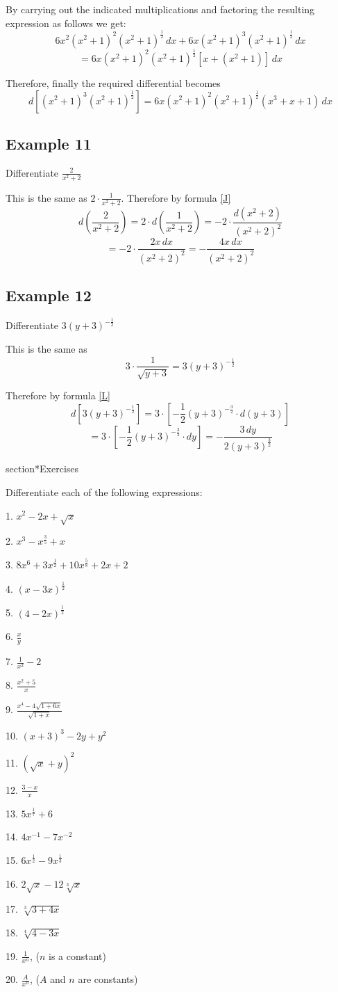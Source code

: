 By carrying out the indicated multiplications and factoring the resulting expression as follows we get:
\[6x^2(x^2+1)^2(x^2+1)^{\frac{1}{2}}\,dx + 6x(x^2+1)^3(x^2+1)^{\frac{1}{2}}\,dx\]
\[= 6x(x^2+1)^2(x^2+1)^{\frac{1}{2}}[x + (x^2+1)]\,dx\]

Therefore, finally the required differential becomes
\[d[(x^2+1)^3(x^2+1)^{\frac{1}{2}}] = 6x(x^2+1)^2(x^2+1)^{\frac{1}{2}}(x^3+x+1)\,dx\]

\subsection*{Example 11}
Differentiate $\frac{2}{x^2 + 2}$

This is the same as $2\cdot\frac{1}{x^2 + 2}$. Therefore by formula \eqref{J}
\[d(\frac{2}{x^2 + 2}) = 2\cdot d(\frac{1}{x^2 + 2}) = -2\cdot\frac{d(x^2 + 2)}{(x^2 + 2)^2}\]
\[= -2\cdot\frac{2x\,dx}{(x^2 + 2)^2} = -\frac{4x\,dx}{(x^2 + 2)^2}\]

\subsection*{Example 12}
Differentiate $3(y+3)^{-\frac{1}{2}}$

This is the same as
\[3\cdot\frac{1}{\sqrt{y+3}} = 3(y+3)^{-\frac{1}{2}}\]

Therefore by formula \eqref{L}
\[d[3(y+3)^{-\frac{1}{2}}] = 3\cdot[-\frac{1}{2}(y+3)^{-\frac{3}{2}}\cdot d(y+3)]\]
\[= 3\cdot[-\frac{1}{2}(y+3)^{-\frac{3}{2}}\cdot dy] = -\frac{3\,dy}{2(y+3)^{\frac{3}{2}}}\]

\clearpage  %

section*{Exercises}

Differentiate each of the following expressions:

1. $x^2 - 2x + \sqrt{x}$

2. $x^3 - x^{\frac{3}{5}} + x$

3. $8x^6 + 3x^{\frac{1}{2}} + 10x^{\frac{5}{8}} + 2x + 2$

4. $(x - 3x)^{\frac{1}{2}}$

5. $(4 - 2x)^{\frac{1}{2}}$

6. $\frac{x}{y}$

7. $\frac{1}{x^2} - 2$

8. $\frac{x^2 + 5}{x}$

9. $\frac{x^4 - 4\sqrt{1+6x}}{\sqrt{1+x}}$

10. $(x+3)^3 - 2y + y^2$

11. $(\sqrt{x} + y)^2$

12. $\frac{3-x}{x}$

13. $5x^{\frac{1}{7}} + 6$

14. $4x^{-1} - 7x^{-2}$

15. $6x^{\frac{1}{2}} - 9x^{\frac{1}{3}}$

16. $2\sqrt{x} - 12\sqrt[3]{x}$

17. $\sqrt[3]{3+4x}$

18. $\sqrt[4]{4-3x}$

19. $\frac{1}{x^n}$, ($n$ is a constant)

20. $\frac{A}{x^n}$, ($A$ and $n$ are constants)
